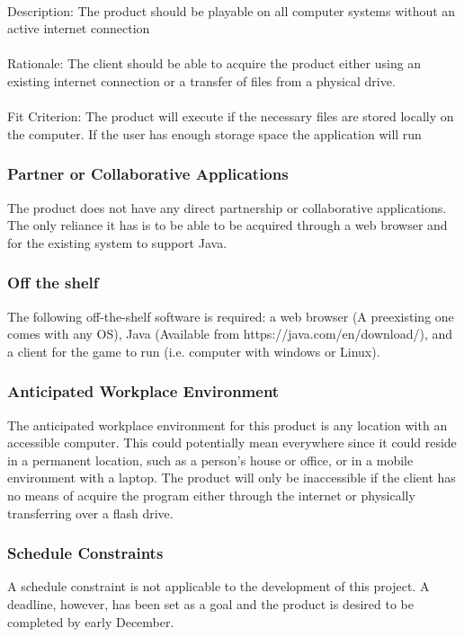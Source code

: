 \documentclass[12pt, titlepage]{article}
\begin{document}
\paragraph{}
Description: The product should be playable on all computer systems without an active internet connection
\paragraph{}
Rationale: The client should be able to acquire the product either using an existing internet connection or a transfer of files from a physical drive.
\paragraph{}
Fit Criterion: The product will execute if the necessary files are stored locally on the computer. If the user has enough storage space the application will run

\subsubsection{Partner or Collaborative Applications}
The product does not have any direct partnership or collaborative applications. The only reliance it has is to be able to be acquired through a web browser and for the existing system to support Java.

\subsubsection{Off the shelf}
The following off-the-shelf software is required: a web browser (A preexisting one comes with any OS), Java (Available from https://java.com/en/download/), and a client for the game to run (i.e. computer with windows or Linux).

\subsubsection{Anticipated Workplace Environment}
The anticipated workplace environment for this product is any location with an accessible computer. This could potentially mean everywhere since it could reside in a permanent location, such as a person's house or office, or in a mobile environment with a laptop. The product will only be inaccessible if the client has no means of acquire the program either through the internet or physically transferring over a flash drive.

\subsubsection{Schedule Constraints}
A schedule constraint is not applicable to the development of this project. A deadline, however, has been set as a goal and the product is desired to be completed by early December.
\end{document}
